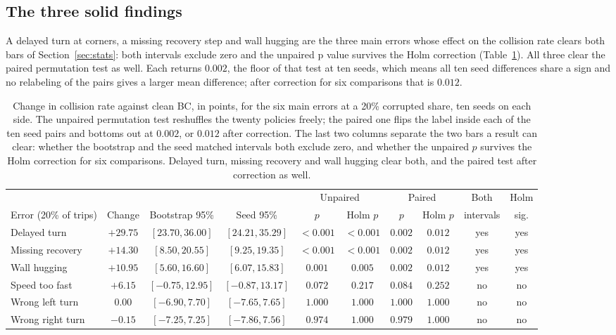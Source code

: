 \documentclass[conference]{IEEEtran}
\begin{document}
\subsection{The three solid findings}
A delayed turn at corners, a missing recovery step and wall hugging are the three main errors whose effect on the
collision rate clears both bars of Section~\ref{sec:stats}: both intervals exclude zero and the unpaired p value
survives the Holm correction (Table~\ref{tab:stats}). All three clear the paired permutation test as well. Each
returns $0.002$, the floor of that test at ten seeds, which means all ten seed differences share a sign and no
relabeling of the pairs gives a larger mean difference; after correction for six comparisons that is $0.012$.

\begin{table}[tbp]
\centering\small
\begin{tabular}{@{}lccccccccc@{}}
\toprule
& & & & \multicolumn{2}{c}{Unpaired} & \multicolumn{2}{c}{Paired} & Both & Holm\\
\cmidrule(lr){5-6}\cmidrule(lr){7-8}
Error (20\% of trips) & Change & Bootstrap 95\% & Seed 95\% & $p$ & Holm $p$ & $p$ & Holm $p$ & intervals & sig.\\
\midrule
Delayed turn & $\mathbf{+29.75}$ & $[23.70,36.00]$ & $[24.21,35.29]$ & $<0.001$ & $\mathbf{<0.001}$ & $0.002$ & $\mathbf{0.012}$ & yes & yes\\
Missing recovery & $\mathbf{+14.30}$ & $[8.50,20.55]$ & $[9.25,19.35]$ & $<0.001$ & $\mathbf{<0.001}$ & $0.002$ & $\mathbf{0.012}$ & yes & yes\\
Wall hugging & $\mathbf{+10.95}$ & $[5.60,16.60]$ & $[6.07,15.83]$ & $0.001$ & $\mathbf{0.005}$ & $0.002$ & $\mathbf{0.012}$ & yes & yes\\
Speed too fast & $+6.15$ & $[-0.75,12.95]$ & $[-0.87,13.17]$ & $0.072$ & $0.217$ & $0.084$ & $0.252$ & no & no\\
Wrong left turn & $0.00$ & $[-6.90,7.70]$ & $[-7.65,7.65]$ & $1.000$ & $1.000$ & $1.000$ & $1.000$ & no & no\\
Wrong right turn & $-0.15$ & $[-7.25,7.25]$ & $[-7.86,7.56]$ & $0.974$ & $1.000$ & $0.979$ & $1.000$ & no & no\\
\bottomrule
\end{tabular}
\caption{Change in collision rate against clean BC, in points, for the six main errors at a 20\% corrupted share,
ten seeds on each side. The unpaired permutation test reshuffles the twenty policies freely; the paired one flips
the label inside each of the ten seed pairs and bottoms out at $0.002$, or $0.012$ after correction. The last two
columns separate the two bars a result can clear: whether the bootstrap and the seed matched intervals both
exclude zero, and whether the unpaired $p$ survives the Holm correction for six comparisons. Delayed turn,
missing recovery and wall hugging clear both, and the paired test after correction as well.}
\label{tab:stats}
\end{table}
\end{document}

